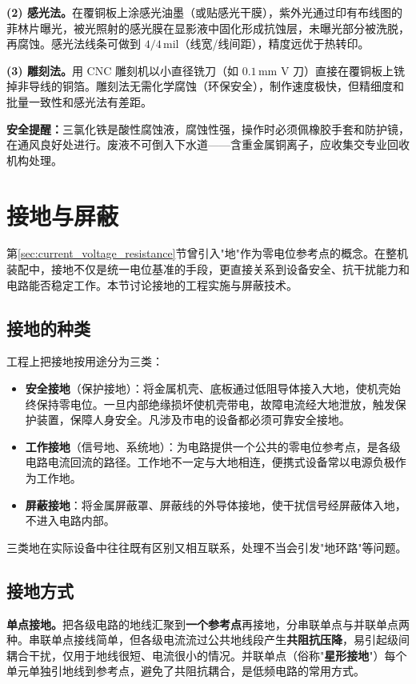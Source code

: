 \documentclass[12pt,UTF8]{ctexbook}
\begin{document}
\textbf{(2) 感光法。}在覆铜板上涂感光油墨（或贴感光干膜），紫外光通过印有布线图的菲林片曝光，被光照射的感光膜在显影液中固化形成抗蚀层，未曝光部分被洗脱，再腐蚀。感光法线条可做到 $4/4\,\mathrm{mil}$（线宽/线间距），精度远优于热转印。

\textbf{(3) 雕刻法。}用 CNC 雕刻机以小直径铣刀（如 $0.1\,\mathrm{mm}$ V 刀）直接在覆铜板上铣掉非导线的铜箔。雕刻法无需化学腐蚀（环保安全），制作速度极快，但精细度和批量一致性和感光法有差距。

\textbf{安全提醒：}三氯化铁是酸性腐蚀液，腐蚀性强，操作时必须佩橡胶手套和防护镜，在通风良好处进行。废液不可倒入下水道——含重金属铜离子，应收集交专业回收机构处理。

\section{接地与屏蔽}
\label{sec:grounding}

第\ref{sec:current_voltage_resistance}节曾引入"地"作为零电位参考点的概念。在整机装配中，接地不仅是统一电位基准的手段，更直接关系到设备安全、抗干扰能力和电路能否稳定工作。本节讨论接地的工程实施与屏蔽技术。

\subsection{接地的种类}

工程上把接地按用途分为三类：
\begin{itemize}
  \item \textbf{安全接地}（保护接地）：将金属机壳、底板通过低阻导体接入大地，使机壳始终保持零电位。一旦内部绝缘损坏使机壳带电，故障电流经大地泄放，触发保护装置，保障人身安全。凡涉及市电的设备都必须可靠安全接地。
  \item \textbf{工作接地}（信号地、系统地）：为电路提供一个公共的零电位参考点，是各级电路电流回流的路径。工作地不一定与大地相连，便携式设备常以电源负极作为工作地。
  \item \textbf{屏蔽接地}：将金属屏蔽罩、屏蔽线的外导体接地，使干扰信号经屏蔽体入地，不进入电路内部。
\end{itemize}
三类地在实际设备中往往既有区别又相互联系，处理不当会引发"地环路"等问题。

\subsection{接地方式}

\textbf{单点接地。}把各级电路的地线汇聚到\textbf{一个参考点}再接地，分串联单点与并联单点两种。串联单点接线简单，但各级电流流过公共地线段产生\textbf{共阻抗压降}，易引起级间耦合干扰，仅用于地线很短、电流很小的情况。并联单点（俗称"\textbf{星形接地}"）每个单元单独引地线到参考点，避免了共阻抗耦合，是低频电路的常用方式。
\end{document}
